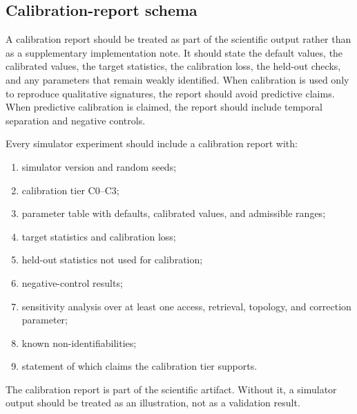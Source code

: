 \documentclass[11pt]{article}
\theoremstyle{remark}
\begin{document}
\subsection{Calibration-report schema}\label{calibration-report-schema}

A calibration report should be treated as part of the scientific output rather than as a supplementary implementation note. It should state the default values, the calibrated values, the target statistics, the calibration loss, the held-out checks, and any parameters that remain weakly identified. When calibration is used only to reproduce qualitative signatures, the report should avoid predictive claims. When predictive calibration is claimed, the report should include temporal separation and negative controls.


Every simulator experiment should include a calibration report with:

\begin{enumerate}[leftmargin=*]
\item simulator version and random seeds;
\item calibration tier C0--C3;
\item parameter table with defaults, calibrated values, and admissible ranges;
\item target statistics and calibration loss;
\item held-out statistics not used for calibration;
\item negative-control results;
\item sensitivity analysis over at least one access, retrieval, topology, and correction parameter;
\item known non-identifiabilities;
\item statement of which claims the calibration tier supports.
\end{enumerate}

The calibration report is part of the scientific artifact. Without it, a simulator output should be treated as an illustration, not as a validation result.
\end{document}
